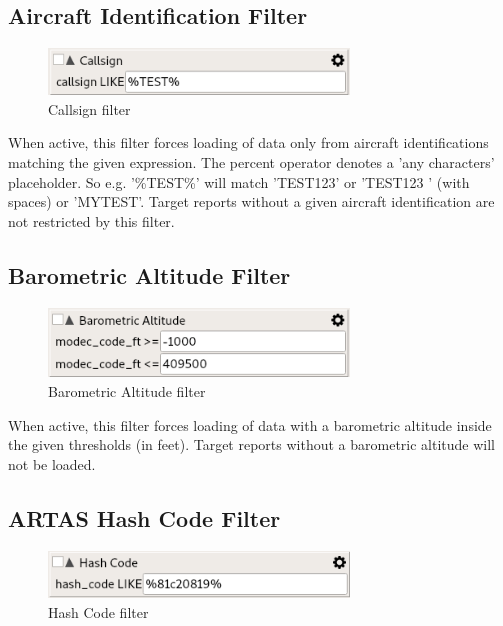 \subsection{Aircraft Identification Filter}

\begin{figure}[H]
  \center
    \includegraphics[width=8cm,frame]{figures/filter_acid.png}
  \caption{Callsign filter}
\end{figure}

When active, this filter forces loading of data only from aircraft identifications matching the given expression. The percent operator denotes a 'any characters' placeholder. So e.g. '\%TEST\%' will match 'TEST123' or 'TEST123   ' (with spaces) or 'MYTEST'. Target reports without a given aircraft identification are not restricted by this filter.

\subsection{Barometric Altitude Filter}

\begin{figure}[H]
  \center
    \includegraphics[width=8cm,frame]{figures/filter_baro_alt.png}
  \caption{Barometric Altitude filter}
\end{figure}

When active, this filter forces loading of data with a barometric altitude inside the given thresholds (in feet). Target reports without a barometric altitude will not be loaded.

\subsection{ARTAS Hash Code Filter}

\begin{figure}[H]
  \center
    \includegraphics[width=8cm,frame]{figures/filter_hashcode.png}
  \caption{Hash Code filter}
\end{figure}

